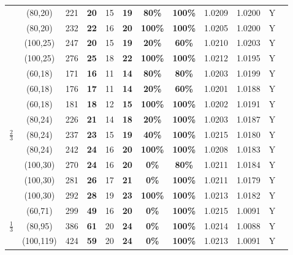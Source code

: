 \documentclass{cta-author}
\begin{document}
\begin{table}[t]
\begin{tabular}{| c|| c|c | c | c | c | c | c |c|c| c| c|}
		&(80,20)&221&\textbf{20}&15&\textbf{19}&\textbf{80\%}&\textbf{100\%}&1.0209&1.0200&Y\\
		
		&(80,20)&232&\textbf{22}&16&\textbf{20}&\textbf{100\%}&\textbf{100\%}&1.0205&1.0200&Y\\
		
		
		&(100,25)&247&\textbf{20}&15&\textbf{19}&\textbf{20\%}&\textbf{60\%}&1.0210&1.0203&Y\\
		
		
		&(100,25)&276&\textbf{25}&18&\textbf{22}&\textbf{100\%}&\textbf{100\%}&1.0212&1.0195&Y\\
		
		
		\hline
		
		
		\multirow{9}{*}{$\frac{2}{3}$}&(60,18)&171&\textbf{16}&11&\textbf{14}&\textbf{80\%}&\textbf{80\%}&1.0203& 1.0199&Y\\	
		
		
		
		&(60,18)&176&\textbf{17}&11&\textbf{14}&\textbf{20\%}&\textbf{60\% }&1.0201&1.0188&Y\\	
		&(60,18)&181&\textbf{18}&12&\textbf{15}&\textbf{100\%}&\textbf{100\% }&1.0202&1.0191&Y\\		
		
		&(80,24)&226&\textbf{21}&14&\textbf{18}&\textbf{20\%}&\textbf{100\%}&1.0203&1.0187&Y\\	
		&(80,24)&237&\textbf{23}&15&\textbf{19}&\textbf{40\%}&\textbf{100\% }&1.0215&1.0180&Y\\	
		&(80,24)&242&\textbf{24}&16&\textbf{20}&\textbf{100\%}&\textbf{100\% }&1.0208&1.0183&Y\\		
		
		&(100,30)&270&\textbf{24}&16&\textbf{20}&\textbf{0\%}&\textbf{80\% }&1.0211&1.0184&Y\\
		
		&(100,30)&281&\textbf{26}&17&\textbf{21}&\textbf{0\%}&\textbf{100\% }&1.0211&1.0179&Y\\
		&(100,30)&292&\textbf{28}&19&\textbf{23}&\textbf{100\%}&\textbf{100\%} &1.0213&1.0182&Y\\	
		
		\hline	
		
	
		
		
			\multirow{3}{*}{$\frac{1}{3}$}&(60,71)	&299&\textbf{49}&16&\textbf{20}&\textbf{0\%}&\textbf{100\% }&1.0215&1.0091&Y\\	
		
		&(80,95)&386&\textbf{61}&20&\textbf{24}&\textbf{0\%}&\textbf{100\% }&1.0214&1.0088&Y\\		
		&(100,119)&424&\textbf{59}&20&\textbf{24}&\textbf{0\%}&\textbf{100\% }&1.0213&1.0091&Y\\	
		

\end{tabular}
\end{table}
\end{document}
